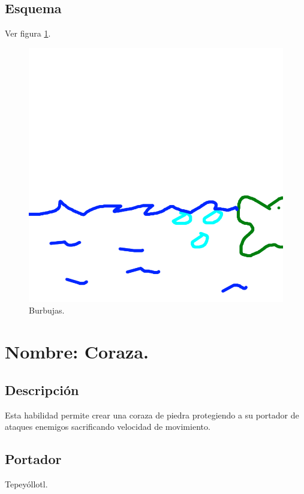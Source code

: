 \subsection{Esquema}
			Ver figura \ref{fig:burbujas}.
			\begin{figure}
				\centering
				\includegraphics[height=0.2 \textheight]{Imagenes/burbujas}
				\caption{Burbujas.}
				\label{fig:burbujas}
			\end{figure}

\section{Nombre: Coraza.}\label{hab.coraza}
\subsection{Descripción}
Esta habilidad permite crear una coraza de piedra protegiendo a su portador de ataques enemigos sacrificando velocidad de movimiento.  
\subsection{Portador}
Tepeyóllotl.
